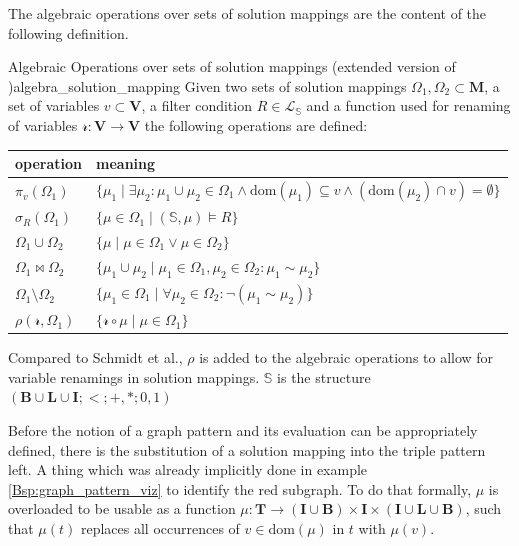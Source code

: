 The algebraic operations over sets of solution mappings are the content of the following definition.

\begin{Def}{Algebraic Operations over sets of solution mappings (extended version of \cite{schmidt2010foundations})}{algebra_solution_mapping}
Given two sets of solution mappings $\Omega_1, \Omega_2 \subset \mathbf{M}$, a set of variables $v \subset \mathbf{V}$, a filter condition $R \in \mathcal{L_\mathbb{S}}$ and a function used for renaming of variables $\mathcal{r}:\mathbf{V} \to \mathbf{V}$ the following operations are defined:
\begin{center}
            \begin{tabular}{l|l}
             \toprule
             operation & meaning \\
             \midrule
             \midrule
             $\pi_v(\Omega_1)$ & $\{\mu_1 \mid \exists \mu_2 : \mu_1 \cup \mu_2 \in \Omega_1 \land \text{dom}(\mu_1) \subseteq v \land (\text{dom}(\mu_2) \cap v) = \emptyset \}$ \\
             $\sigma_R(\Omega_1)$ & $\{\mu \in \Omega_1 \mid (\mathbb{S}, \mu) \models R \}$ \\
             $\Omega_1 \cup \Omega_2$ & $\{\mu \mid \mu \in \Omega_1 \lor \mu \in \Omega_2 \}$ \\
             $\Omega_1 \bowtie \Omega_2$ & $\{\mu_1 \cup \mu_2 \mid \mu_1 \in \Omega_1, \mu_2 \in \Omega_2 : \mu_1 \sim \mu_2\}$ \\
             $\Omega_1 \setminus \Omega_2$ & $\{\mu_1 \in \Omega_1 \mid \forall \mu_2 \in \Omega_2 : \neg (\mu_1 \sim \mu_2)\}$ \\
             $\rho(\mathcal{r},\Omega_1)$ & $\{ \mathcal{r} \circ \mu \mid \mu \in \Omega_1\}$\\
             \bottomrule
        \end{tabular}
\end{center}
Compared to Schmidt et al., $\rho$ is added to the algebraic operations to allow for variable renamings in solution mappings. $\mathbb{S}$ is the structure $(\mathbf{B} \cup \mathbf{L} \cup \mathbf{I}; {<}; {+,*};{0,1})$
\end{Def}

Before the notion of a graph pattern and its evaluation can be appropriately defined, there is the substitution of a solution mapping into the triple pattern left. A thing which was already implicitly done in example \ref{Bsp:graph_pattern_viz} to identify the red subgraph.
To do that formally, $\mu$ is overloaded to be usable as a function $\mu: \mathbf{T} \to (\mathbf{I} \cup \mathbf{B}) \times \mathbf{I} \times (\mathbf{I} \cup \mathbf{L} \cup \mathbf{B})$, such that $\mu(t)$ replaces all occurrences of $v \in \text{dom}(\mu)$ in $t$ with $\mu(v)$. 

